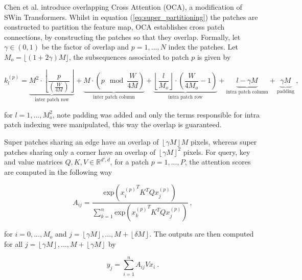 Chen et al. \cite{chenHATHybridAttention2024} introduce overlapping Cross Attention (OCA),
a modification of SWin Transformers.
Whilst in equation (\ref{eq:super_partitioning}) the patches are constructed to partition the feature map,
OCA establishes cross patch connections,
by constructing the patches so that they overlap.
Formally, let $\gamma \in (0, 1)$ be the factor of overlap and $p = 1, ..., N$ index the patches.
Let $M_o = \lfloor (1 + 2\gamma)M \rfloor$, the subsequences associated to patch $p$ is given by

\begin{equation} \label{eq:oca_partitioning}
    k_l^{(p)} = \underbrace{M^2 \cdot \left \lfloor \frac{p}{\left( \frac{W}{4M} \right)}\right \rfloor}_\text{inter patch row}
        + \underbrace{M \cdot \left( p \mod \frac{W}{4M} \right)}_\text{inter patch column}
        + \underbrace{\left \lfloor \frac{l}{M_o}\right \rfloor \cdot \left( \frac{W}{4M_o} - 1 \right)}_\text{intra patch row}
        + \underbrace{l - \gamma M}_\text{intra patch column} 
        + \underbrace{\gamma M}_\text{padding} ~,
\end{equation}

for $l = 1, ..., M_o^2$, note padding was added and only the terms responsible for intra patch indexing were manipulated,
this way the overlap is guaranteed.

\noindent Super patches sharing an edge have an overlap of $\left \lfloor \gamma M \right \rfloor M$ pixels,
whereas super patches sharing only a corner have an overlap of $ \left \lfloor \gamma M \right \rfloor^2$ pixels.
For query, key and value matrices $Q, K, V \in \mathbb R^{d', d}$, 
for a patch $p = 1, ..., P$, 
the attention scores are computed in the following way

    \begin{equation} \label{eq:oca1}
        A_{ij} = \frac{\text{exp}({x_{i}^{(p)}}^T K^T Q x_{j}^{(p)})}{\sum_{k = 1}^n \text{exp}({x_{k}^{(p)}}^T K^T Q x_{j}^{(p)})} ~,
    \end{equation}

for $i = 0, ..., M_o$
and $j = \left \lfloor \gamma M \right \rfloor, ..., M + \left \lfloor \delta M \right \rfloor$.
The outputs are then computed for all $j = \left \lfloor \gamma M \right \rfloor, ..., M + \left \lfloor \gamma M \right \rfloor$ by 

    \begin{equation} \label{eq:oca2}
        y_{j} = \sum_{i=1}^n A_{ij} V x_{i} ~.
    \end{equation}

